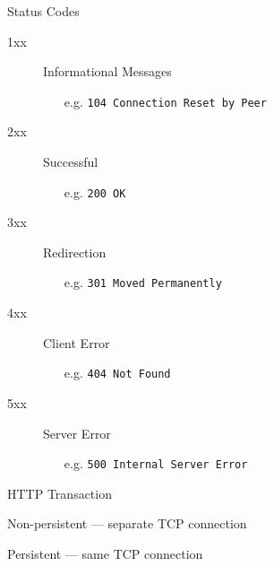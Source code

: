 \begin{frame}{Status Codes}
  \begin{description}
  \item[1xx] Informational Messages
    \begin{itemize}
    \item[e.g.] \texttt{104 Connection Reset by Peer}
    \end{itemize}
  \item[2xx] Successful
    \begin{itemize}
    \item[e.g.] \texttt{200 OK}
    \end{itemize}
  \item[3xx] Redirection
    \begin{itemize}
    \item[e.g.] \texttt{301 Moved Permanently}
    \end{itemize}
  \item[4xx] Client Error
    \begin{itemize}
    \item[e.g.] \texttt{404 Not Found}
    \end{itemize}
  \item[5xx] Server Error
    \begin{itemize}
    \item[e.g.] \texttt{500 Internal Server Error}
    \end{itemize}
  \end{description}
\end{frame}

\begin{frame}{HTTP Transaction}
  \begin{iblock}{Non-persistent --- separate TCP connection}
    \begin{center}
       
    \end{center}
  \end{iblock}
\end{frame}

\begin{frame}
  \begin{iblock}{Persistent --- same TCP connection}
    \begin{center}
       
    \end{center}
  \end{iblock}
\end{frame}

